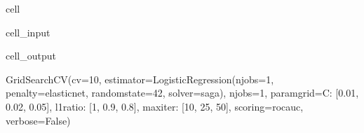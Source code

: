 \documentclass[letterpaper,10pt,english]{jupyterBook}
\begin{document}
\begin{sphinxuseclass}{cell}
\begin{sphinxVerbatimInput}
\begin{sphinxuseclass}{cell_input}
\end{sphinxuseclass}\end{sphinxVerbatimInput}
\begin{sphinxVerbatimOutput}

\begin{sphinxuseclass}{cell_output}
\begin{sphinxVerbatim}[commandchars=\\\{\}]
GridSearchCV(cv=10,
             estimator=LogisticRegression(n\PYGZus{}jobs=\PYGZhy{}1, penalty=\PYGZsq{}elasticnet\PYGZsq{},
                                          random\PYGZus{}state=42, solver=\PYGZsq{}saga\PYGZsq{}),
             n\PYGZus{}jobs=\PYGZhy{}1,
             param\PYGZus{}grid=\PYGZob{}\PYGZsq{}C\PYGZsq{}: [0.01, 0.02, 0.05], \PYGZsq{}l1\PYGZus{}ratio\PYGZsq{}: [1, 0.9, 0.8],
                         \PYGZsq{}max\PYGZus{}iter\PYGZsq{}: [10, 25, 50]\PYGZcb{},
             scoring=\PYGZsq{}roc\PYGZus{}auc\PYGZsq{}, verbose=False)
\end{sphinxVerbatim}

\end{sphinxuseclass}\end{sphinxVerbatimOutput}

\end{sphinxuseclass}
\end{document}
